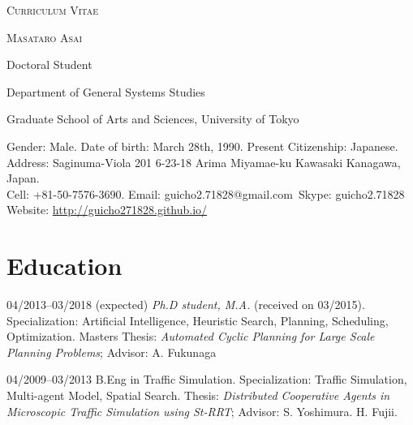 \documentclass[letterpaper,12pt]{article}
\begin{document}
\pagestyle{empty}

\begin{center}
\huge{\textsc{Curriculum Vitae}}
\vspace{0.7\baselineskip}

\Large{\textsc{Masataro Asai}}
\vspace{0.5\baselineskip}

\large{
Doctoral Student

Department of General Systems Studies

Graduate School of Arts and Sciences, University of Tokyo
}

\vspace{0.8\baselineskip}

\normalsize{
 Gender: Male. Date of birth: March 28th, 1990. Present Citizenship: Japanese. \\
 Address: Saginuma-Viola 201 6-23-18 Arima Miyamae-ku Kawasaki Kanagawa, Japan. \\
 Cell: +81-50-7576-3690. Email: guicho2.71828@gmail.com\ Skype: guicho2.71828\\
 Website: \url{http://guicho271828.github.io/}}
\end{center}


\section{Education}

\begin{CV}
 \item[04/2013--03/2018] (expected) \textit{Ph.D student, M.A.} (received on 03/2015).
 Specialization: Artificial Intelligence, Heuristic Search, Planning, Scheduling, Optimization.
 {\small Masters Thesis: \emph{Automated Cyclic Planning for Large Scale Planning Problems}; Advisor: A. Fukunaga}

 \item[04/2009--03/2013] B.Eng in Traffic Simulation.
 Specialization: Traffic Simulation, Multi-agent Model, Spatial Search.
 {\small Thesis: \emph{Distributed Cooperative Agents in Microscopic
 Traffic Simulation using St-RRT}; Advisor: S. Yoshimura. H. Fujii.}
\end{CV}

\renewcommand{\refname}{Publications \& Presentations}

\let\uline\relax
\nocite{Asai2016}
\nocite{Asai2015}
\nocite{Asai2014}
\nocite{Asai2014b}
\end{document}
